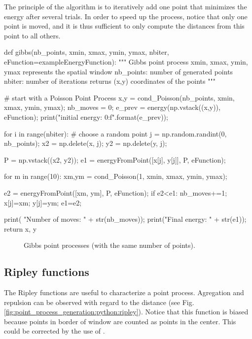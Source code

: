 The principle of the algorithm is to iteratively add one point that minimizes the energy after several trials. In order to speed up the process, notice that only one point is moved, and it is thus sufficient to only compute the distances from this point to all others.
\begin{python}
def gibbs(nb_points, xmin, xmax, ymin, ymax, nbiter, eFunction=exampleEnergyFunction):
    """
    Gibbs point process
    xmin, xmax, ymin, ymax represents the spatial window
    nb_points: number of generated points
    nbiter: number of iterations
    returns (x,y) coordinates of the points
    """
    
    # start with a Poisson Point Process
    x,y = cond_Poisson(nb_points, xmin, xmax, ymin, ymax);
    nb_moves = 0;
    e_prev = energy(np.vstack((x,y)), eFunction);
    print("initial energy: {0:f}".format(e_prev));

    for i in range(nbiter):
        # choose a random point
        j = np.random.randint(0, nb_points);
        x2 = np.delete(x, j);
        y2 = np.delete(y, j);
        
        P = np.vstack((x2, y2));
        e1 = energyFromPoint([x[j], y[j]], P, eFunction);
        
        for m in range(10):
            xm,ym = cond_Poisson(1, xmin, xmax, ymin, ymax);
            
            e2 = energyFromPoint([xm, ym], P, eFunction);
            if e2<e1:
                nb_moves+=1;
                x[j]=xm;
                y[j]=ym;
                e1=e2;
          
    print( "Number of moves: " + str(nb_moves));
    print("Final energy:    " + str(e1));
    return x, y
\end{python}

\begin{figure}[H]
 \centering\caption{Gibbs point processes (with the same number of points).}%
 \hfill
 \label{fig:point_process_generation:python:gpp}%
\end{figure}

\subsection{Ripley functions}
The Ripley functions are useful to characterize a point process. Agregation and repulsion can be observed with regard to the distance (see Fig.\ref{fig:point_process_generation:python:ripley}). Notice that this function is biased because points in border of window are counted as points in the center. This could be corrected by the use of .

